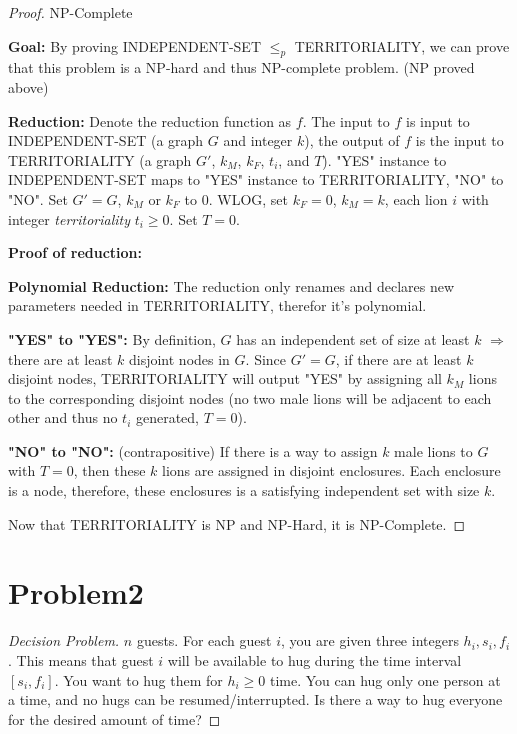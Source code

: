 \documentclass[openany]{article}
\begin{document}
\begin{proof}{NP-Complete}

\textbf{Goal:} By proving INDEPENDENT-SET $\leqslant_p$ TERRITORIALITY, we can prove that this problem is a NP-hard and thus NP-complete problem. (NP proved above)

\textbf{Reduction:} Denote the reduction function as $f$. The input to $f$ is input to INDEPENDENT-SET (a graph $G$ and integer $k$), the output of $f$ is the input to TERRITORIALITY (a graph $G'$, $k_M$, $k_F$, $t_i$, and $T$). "YES" instance to INDEPENDENT-SET maps to "YES" instance to TERRITORIALITY, "NO" to "NO". Set $G' = G$, $k_M$ or $k_F$ to $0$. WLOG, set $k_F=0$, $k_M = k$, each lion $i$ with integer \textit{territoriality} $t_i\geqslant 0$. Set $T=0$.

\textbf{Proof of reduction:}

\textbf{Polynomial Reduction:} The reduction only renames and declares new parameters needed in TERRITORIALITY, therefor it's polynomial.

\textbf{"YES" to "YES":} By definition, $G$ has an independent set of size at least $k$ $\Rightarrow$ there are at least $k$ disjoint nodes in $G$. Since $G' = G$, if there are at least $k$ disjoint nodes, TERRITORIALITY will output "YES" by assigning all $k_M$ lions to the corresponding disjoint nodes (no two male lions will be adjacent to each other and thus no $t_i$ generated, $T=0$).

\textbf{"NO" to "NO":} (contrapositive) If there is a way to assign $k$ male lions to $G$ with $T=0$, then these $k$ lions are assigned in disjoint enclosures. Each enclosure is a node, therefore, these enclosures is a satisfying independent set with size $k$.



Now that TERRITORIALITY is NP and NP-Hard, it is NP-Complete.

\end{proof}

\section*{Problem2}

\begin{proof}[Decision Problem]
    \renewcommand{\qedsymbol}{}
    $n$ guests. For each guest $i$, you are given three integers $h_i, s_i, f_i$. This means that guest $i$ will be available to hug during the time interval $[s_i, f_i]$. You want to hug them for $h_i \geqslant 0$ time. You can hug only one person at a time, and no hugs can be resumed/interrupted.
    Is there a way to hug everyone for the desired amount of time?
\end{proof}
\end{document}
